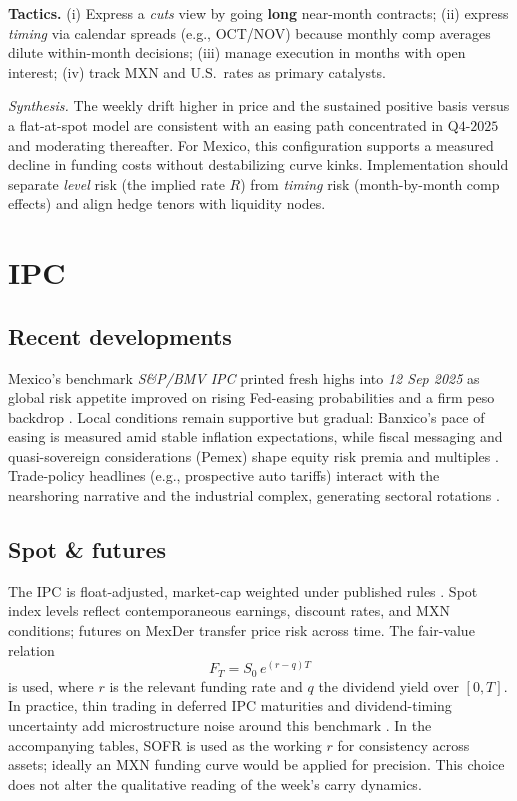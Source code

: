 \documentclass[11pt,a4paper]{article} %
\let\oldsection\section
\renewcommand{\section}{%
    \clearpage
    \thispagestyle{myfancy}%
    \oldsection
  }
\begin{document}
\textbf{Tactics.} 
(i) Express a \emph{cuts} view by going \textbf{long} near-month contracts; 
(ii) express \emph{timing} via calendar spreads (e.g., OCT/NOV) because monthly comp averages dilute within-month decisions; 
(iii) manage execution in months with open interest; 
(iv) track MXN and U.S.\ rates as primary catalysts.

\medskip
\noindent\emph{Synthesis.} The weekly drift higher in price and the sustained positive basis versus a flat-at-spot model are consistent with an easing path concentrated in \(\text{Q4-2025}\) and moderating thereafter. For Mexico, this configuration supports a measured decline in funding costs without destabilizing curve kinks. Implementation should separate \emph{level} risk (the implied rate \(R\)) from \emph{timing} risk (month-by-month comp effects) and align hedge tenors with liquidity nodes.



\section{IPC}

\subsection{Recent developments}
Mexico’s benchmark \emph{S\&P/BMV IPC} printed fresh highs into \emph{12 Sep 2025} as global risk appetite improved on rising Fed-easing probabilities and a firm peso backdrop \citep{reuters_ipc_record_2025,reuters_usdmxn_quote}. Local conditions remain supportive but gradual: Banxico’s pace of easing is measured amid stable inflation expectations, while fiscal messaging and quasi-sovereign considerations (Pemex) shape equity risk premia and multiples \citep{bloomberg_mx_inflation_2025,mnd_inflation_band_2025,reuters_budget_2025,reuters_pemex_plan_2025}. Trade-policy headlines (e.g., prospective auto tariffs) interact with the nearshoring narrative and the industrial complex, generating sectoral rotations \citep{reuters_tariffs_china_autos_2025,reuters_border_jobs_2025}.

\subsection{Spot \& futures}
The IPC is float-adjusted, market-cap weighted under published rules \citep{spdj_ipc_page,spdj_bmv_methodology}. Spot index levels reflect contemporaneous earnings, discount rates, and MXN conditions; futures on MexDer transfer price risk across time. The fair-value relation
\[
F_T = S_0\,e^{(r-q)T}
\]
is used, where \(r\) is the relevant funding rate and \(q\) the dividend yield over \([0,T]\). In practice, thin trading in deferred IPC maturities and dividend-timing uncertainty add microstructure noise around this benchmark \citep{mexder_ipc_fut}. In the accompanying tables, SOFR is used as the working \(r\) for consistency across assets; ideally an MXN funding curve would be applied for precision. This choice does not alter the qualitative reading of the week’s carry dynamics.
\end{document}
